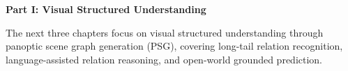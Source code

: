 
\cleardoublepage
{}
{}
\thispagestyle{plain}

\vspace*{\fill}
\begin{center}
{\Huge\bfseries Part I: Visual Structured Understanding\par}
\vspace{1.5cm}
\begin{minipage}{0.8\textwidth}
\centering
The next three chapters focus on visual structured understanding through panoptic scene graph generation (PSG), covering long-tail relation recognition, language-assisted relation reasoning, and open-world grounded prediction.
\end{minipage}
\end{center}
\vspace*{\fill}

\clearpage

